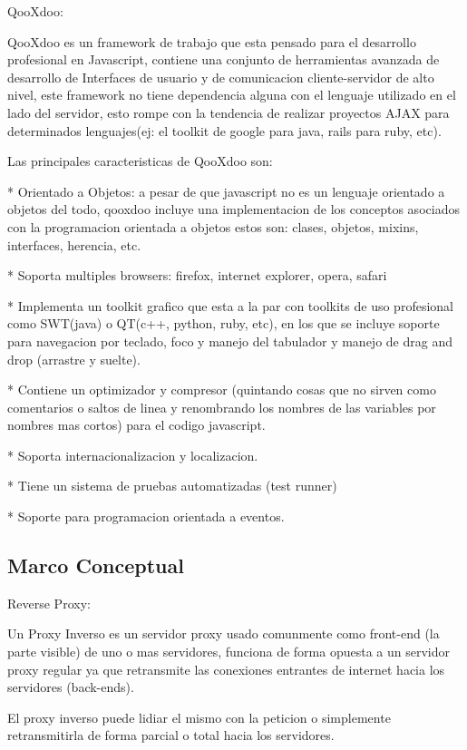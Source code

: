 QooXdoo:

QooXdoo es un framework de trabajo que esta pensado para el desarrollo profesional en Javascript, contiene una conjunto de herramientas avanzada de desarrollo de Interfaces de usuario y de comunicacion cliente-servidor de alto nivel, este framework no tiene dependencia alguna con el lenguaje utilizado en el lado del servidor, esto rompe con la tendencia de realizar proyectos AJAX para determinados lenguajes(ej: el toolkit de google para java, rails para ruby, etc).

Las principales caracteristicas de QooXdoo son:

* Orientado a Objetos: a pesar de que javascript no es un lenguaje orientado a objetos del todo, qooxdoo incluye una implementacion de los conceptos asociados con la programacion orientada a objetos estos son: clases, objetos, mixins, interfaces, herencia, etc.

* Soporta multiples browsers: firefox, internet explorer, opera, safari

* Implementa un toolkit grafico que esta a la par con toolkits de uso profesional como SWT(java) o QT(c++, python, ruby, etc), en los que se incluye soporte para navegacion por teclado, foco y manejo del tabulador y manejo de drag and drop (arrastre y suelte).

* Contiene un optimizador y compresor (quintando cosas que no sirven como comentarios o saltos de linea y renombrando los nombres de las variables por nombres mas cortos) para el codigo javascript.

* Soporta internacionalizacion y localizacion.

* Tiene un sistema de pruebas automatizadas (test runner)

* Soporte para programacion orientada a eventos.


\subsection{Marco Conceptual}

Reverse Proxy:

Un Proxy Inverso es un servidor proxy usado comunmente como front-end (la parte visible) de uno o mas servidores, funciona de forma opuesta a un servidor proxy regular ya que retransmite las conexiones entrantes de internet hacia los servidores (back-ends).

El proxy inverso puede lidiar el mismo con la peticion o simplemente retransmitirla de forma parcial o total hacia los servidores.

